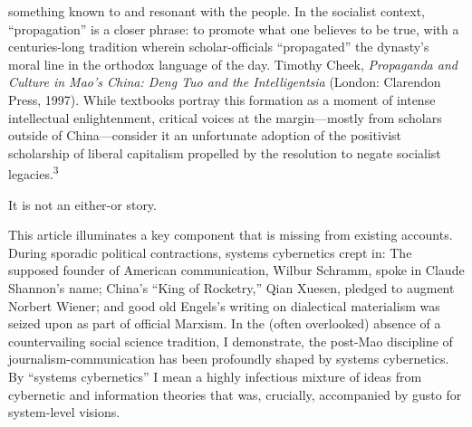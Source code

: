 \documentclass{tufte-handout}
\begin{document}
\begin{CJK*}{UTF8}{gbsn}
{  something known to and resonant with the people. In the socialist
  context, ``propagation'' is a closer phrase: to promote what one
  believes to be true, with a centuries-long tradition wherein
  scholar-officials ``propagated'' the dynasty's moral line in the
  orthodox language of the day. Timothy Cheek, \emph{Propaganda and
  Culture in Mao's China: Deng Tuo and the Intelligentsia} (London:
  Clarendon Press, 1997).} While textbooks portray this formation as a
moment of intense intellectual enlightenment, critical voices at the
margin---mostly from scholars outside of China---consider it an
unfortunate adoption of the positivist scholarship of liberal capitalism
propelled by the resolution to negate socialist legacies.\textsuperscript{3}

It is not an either-or story.

This article illuminates a key component that is missing from existing
accounts. During sporadic political contractions, systems cybernetics
crept in: The supposed founder of American communication, Wilbur
Schramm, spoke in Claude Shannon's name; China's ``King of Rocketry,''
Qian Xuesen, pledged to augment Norbert Wiener; and good old Engels's
writing on dialectical materialism was seized upon as part of official
Marxism. In the (often overlooked) absence of a countervailing social
science tradition, I demonstrate, the post-Mao discipline of
journalism-communication has been profoundly shaped by systems
cybernetics. By ``systems cybernetics'' I mean a highly infectious
mixture of ideas from cybernetic and information theories that was,
crucially, accompanied by gusto for system-level visions.


\end{CJK*}
\end{document}
